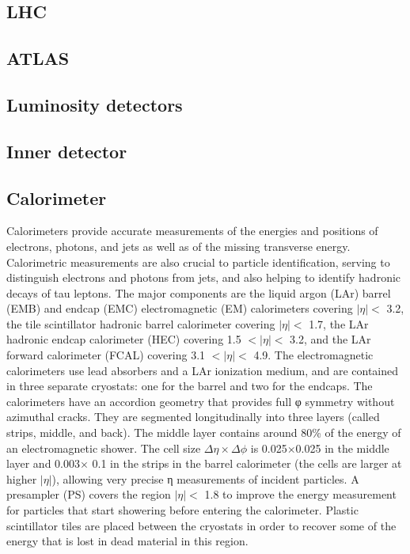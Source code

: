 \subsection{LHC}
\subsection{ATLAS}
\subsection{Luminosity detectors}
\subsection{Inner detector}
\subsection{Calorimeter}
Calorimeters provide accurate measurements of the energies and positions of electrons, photons, and jets as well as of the missing transverse energy. Calorimetric measurements are also crucial to particle identification, serving to distinguish electrons and photons from jets, and also helping to identify hadronic decays of tau leptons. 
The major components are the liquid argon (LAr) barrel (EMB) and endcap (EMC) electromagnetic (EM) calorimeters covering $|\eta| <$ 3.2, the tile scintillator hadronic barrel calorimeter covering $|\eta| <$ 1.7, the LAr hadronic endcap calorimeter (HEC) covering 1.5 $< |\eta| <$ 3.2, and the LAr forward calorimeter (FCAL) covering 3.1 $< |\eta| <$ 4.9. The electromagnetic calorimeters use lead absorbers and a LAr ionization medium, and are contained in three separate cryostats: one for the barrel and two for the endcaps. 
The calorimeters have an accordion geometry that provides full φ symmetry without azimuthal cracks. They are segmented longitudinally into three layers (called strips, middle, and back). The middle layer contains around 80\% of the energy of an electromagnetic shower. The cell size $\Delta\eta \times\Delta\phi$ is 0.025$\times$0.025 in the middle layer and 0.003$\times$ 0.1 in the strips in the barrel calorimeter (the cells are larger at higher $|\eta|$), allowing very precise η measurements of incident particles. A presampler (PS) covers the region $|\eta| <$ 1.8 to improve the energy measurement for particles that start showering before entering the calorimeter. Plastic scintillator tiles are placed between the cryostats in order to recover some of the energy that is lost in dead material in this region. 
